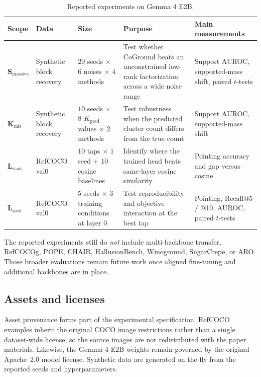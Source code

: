 \documentclass[11pt,a4paper]{article}
\begin{document}
\begin{table}[htbp]
\caption{Reported experiments on Gemma 4 E2B.}
\label{tab:data}
\centering
\footnotesize
\setlength{\tabcolsep}{3pt}
\setlength{\tabcolsep}{4pt}
\begin{tabularx}{\linewidth}{@{}L{.12\linewidth}L{.13\linewidth}L{.20\linewidth}Y Y@{}}
\toprule
Scope & Data & Size & Purpose & Main measurements \\
\midrule
$\textbf{S}_{\mathrm{massive}}$ & Synthetic block recovery & $20$ seeds $\times$ $6$ noises $\times$ $4$ methods & Test whether CoGround beats an unconstrained low-rank factorization across a wide noise range & Support AUROC, supported-mass shift, paired $t$-tests \\
$\textbf{K}_{\mathrm{mis}}$ & Synthetic block recovery & $10$ seeds $\times$ $8$ $K_{\mathrm{pred}}$ values $\times$ $2$ methods & Test robustness when the predicted cluster count differs from the true count & Support AUROC, supported-mass shift \\
$\textbf{L}_{\mathrm{scan}}$ & RefCOCO val0 & $10$ taps $\times$ $1$ seed + $10$ cosine baselines & Identify where the trained head beats same-layer cosine similarity & Pointing accuracy and gap versus cosine \\
$\textbf{L}_{\mathrm{seed}}$ & RefCOCO val0 & $5$ seeds $\times$ $3$ training conditions at layer $0$ & Test reproducibility and objective interaction at the best tap & Pointing, Recall@5 / @10, AUROC, paired $t$-tests \\
\bottomrule
\end{tabularx}
\end{table}

The reported experiments still do \emph{not} include multi-backbone transfer, RefCOCOg, POPE, CHAIR, HallusionBench, Winoground, SugarCrepe, or ARO. Those broader evaluations remain future work once aligned fine-tuning and additional backbones are in place.

\subsection{Assets and licenses}
\label{sec:assets}

Asset provenance forms part of the experimental specification. RefCOCO examples inherit the original COCO image restrictions rather than a single dataset-wide license, so the source images are not redistributed with the paper materials. Likewise, the Gemma 4 E2B weights remain governed by the original Apache~2.0 model license. Synthetic data are generated on the fly from the reported seeds and hyperparameters.
\end{document}
